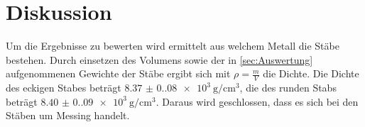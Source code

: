 \section{Diskussion}
\label{sec:Diskussion}

Um die Ergebnisse zu bewerten wird ermittelt aus welchem Metall die Stäbe bestehen. Durch einsetzen des Volumens sowie der in \autoref{sec:Auswertung}
aufgenommenen Gewichte der Stäbe ergibt sich mit $ρ = \frac{m}{V}$ die Dichte. Die Dichte des eckigen Stabes beträgt $\SI{8.37(0.08)e3}{\gram\per\centi\meter\cubed}$, die 
des runden Stabs beträgt $\SI{8.40(0.09)e3}{\gram\per\centi\meter\cubed}.$ Daraus wird geschlossen, dass es sich bei den Stäben um Messing handelt.